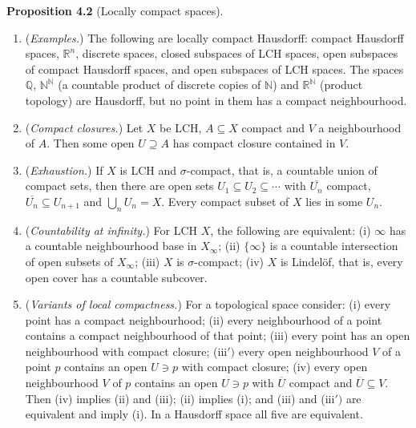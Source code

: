 \documentclass[
  english,
  11pt,
  a4paper,
]{article}
\providecommand{\tightlist}{%
  \setlength{\itemsep}{0pt}\setlength{\parskip}{0pt}}
\begin{document}
\textbf{Proposition 4.2} (Locally compact spaces).

\begin{enumerate}
\tightlist
\item
  (\emph{Examples.}) The following are locally compact Hausdorff:
  compact Hausdorff spaces, \(\mathbb R^n\), discrete spaces, closed
  subspaces of LCH spaces, open subspaces of compact Hausdorff spaces,
  and open subspaces of LCH spaces. The spaces \(\mathbb Q\),
  \(\mathbb N^{\mathbb N}\) (a countable product of discrete copies of
  \(\mathbb N\)) and \(\mathbb R^{\mathbb N}\) (product topology) are
  Hausdorff, but no point in them has a compact neighbourhood.
\item
  (\emph{Compact closures.}) Let \(X\) be LCH, \(A\subseteq X\) compact
  and \(V\) a neighbourhood of \(A\). Then some open \(U\supseteq A\)
  has compact closure contained in \(V\).
\item
  (\emph{Exhaustion.}) If \(X\) is LCH and \(\sigma\)-compact, that is,
  a countable union of compact sets, then there are open sets
  \(U_1\subseteq U_2\subseteq\cdots\) with \(\overline{U_n}\) compact,
  \(\overline{U_n}\subseteq U_{n+1}\) and \(\bigcup_nU_n=X\). Every
  compact subset of \(X\) lies in some \(U_n\).
\item
  (\emph{Countability at infinity.}) For LCH \(X\), the following are
  equivalent: (i) \(\infty\) has a countable neighbourhood base in
  \(X_\infty\); (ii) \(\{\infty\}\) is a countable intersection of open
  subsets of \(X_\infty\); (iii) \(X\) is \(\sigma\)-compact; (iv) \(X\)
  is Lindelöf, that is, every open cover has a countable subcover.
\item
  (\emph{Variants of local compactness.}) For a topological space
  consider: (i) every point has a compact neighbourhood; (ii) every
  neighbourhood of a point contains a compact neighbourhood of that
  point; (iii) every point has an open neighbourhood with compact
  closure; (iii\(')\) every open neighbourhood \(V\) of a point \(p\)
  contains an open \(U\ni p\) with compact closure; (iv) every open
  neighbourhood \(V\) of \(p\) contains an open \(U\ni p\) with
  \(\overline U\) compact and \(\overline U\subseteq V\). Then (iv)
  implies (ii) and (iii); (ii) implies (i); and (iii) and (iii\(')\) are
  equivalent and imply (i). In a Hausdorff space all five are
  equivalent.
\end{enumerate}
\end{document}

